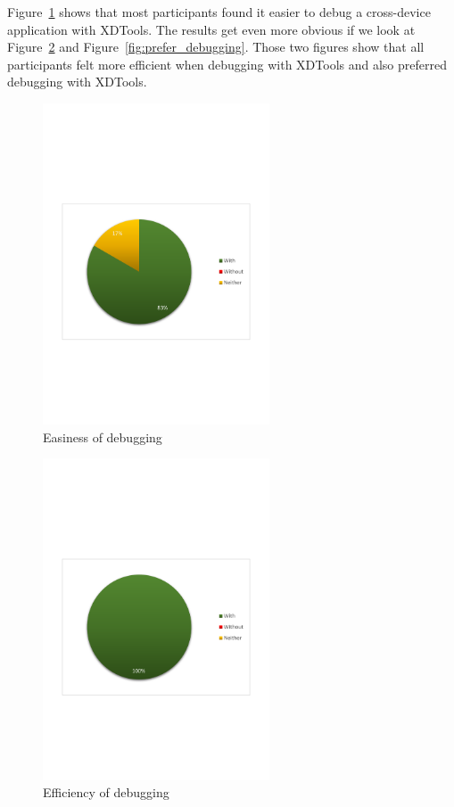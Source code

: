 Figure~\ref{fig:debugging_easier} shows that most participants found it easier to debug a cross-device application with XDTools. The results get even more obvious if we look at Figure~\ref{fig:debugging_efficient} and Figure~\ref{fig:prefer_debugging}. Those two figures show that all participants felt more efficient when debugging with XDTools and also preferred debugging with XDTools.

\begin{figure}[H]
  \centering
    \includegraphics[width=0.6\textwidth]{images/charts/debugging_easier.pdf}
	\caption[Easiness of debugging]{Easiness of debugging}
	\label{fig:debugging_easier}
\end{figure}

\begin{figure}[H]
  \centering
    \includegraphics[width=0.6\textwidth]{images/charts/debugging_efficient.pdf}
	\caption[Efficiency of debugging]{Efficiency of debugging}
	\label{fig:debugging_efficient}
\end{figure}

